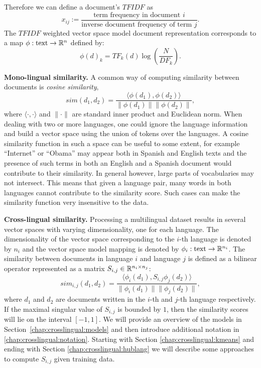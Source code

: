 Therefore we can define a document's $TFIDF$ as
$$ x_{ij}  := \frac{\mbox{term frequency in document } i}{\mbox{inverse document frequency of term } j}.$$
The $TFIDF$ weighted vector space model document representation corresponds 
to a map $\phi : \text{text} \rightarrow \mathbb{R}^n$ defined by: 
$$\phi(d)_k = {TF}_k(d) \log\left( \frac{N}{{DF}_k}\right).$$

\noindent\textbf {Mono-lingual similarity.}
A common way of computing similarity between documents is \emph{cosine similarity},
$$sim(d_1, d_2) = \frac{\langle \phi(d_1), \phi(d_2)\rangle}{\|\phi(d_1)\| \|\phi(d_2)\|},$$
where $\langle \cdot,\cdot \rangle$ and $\|\cdot\|$ are standard inner product and 
Euclidean norm. When dealing with two or more languages, one could ignore the language information
and build a vector space using the union of tokens over the languages. A cosine similarity 
function in such a space can be useful to some extent, for example ``Internet'' or ``Obama'' 
may appear both in Spanish and English texts and the presence of such terms in both an 
English and a Spanish document would contribute to their similarity. In general however, 
large parts of vocabularies may not intersect. This means that given a language pair, 
many words in both languages cannot contribute to the similarity score. Such cases 
can make the similarity function very insensitive to the data.

\noindent\textbf {Cross-lingual similarity.}
Processing a multilingual dataset results in several vector spaces with varying dimensionality, 
one for each language. The dimensionality of the vector space corresponding to the $i$-th 
language is denoted by $n_i$ and the vector space model mapping is denoted by 
$\phi_i : \text{text} \rightarrow \mathbb{R}^{n_i}$.
The similarity between documents in language $i$ and language $j$ is defined as a bilinear 
operator represented as a matrix $S_{i,j} \in \mathbb{R}^{n_i \times n_j}$:
$$sim_{i,j}(d_1, d_2) = \frac{ \langle \phi_i (d_1), S_{i,j} \phi_j (d_2) \rangle }{\|\phi_i(d_1)\| \|\phi_j(d_2)\|},$$
where $d_1$ and $d_2$ are documents written in the $i$-th and $j$-th language respectively. 
If the maximal singular value of $S_{i,j}$ is bounded by $1$, then the similarity scores 
will lie on the interval $[-1, 1]$. We will provide an overview of the models in 
Section~\ref{chap:crosslingual:models} and then introduce additional notation in \ref{chap:crosslingual:notation}.
Starting with Section \ref{chap:crosslingual:kmeans} and ending with Section \ref{chap:crosslingual:hublang} we will
describe some approaches to compute $S_{i,j}$ given training data.

